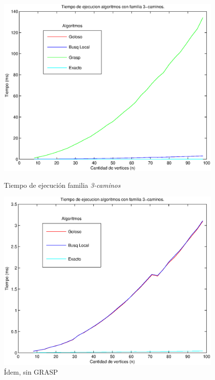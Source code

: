 \begin{figure}[H]
    \begin{minipage}{0.5\linewidth}
      \includegraphics[width=\linewidth]{graficos/todos_tiempo_3caminos.eps}
      \caption{Tiempo de ejecución familia \emph{3-caminos}}\label{fig:3caminos-all}
    \end{minipage}
    \hfill
    \begin{minipage}{0.5\linewidth}
      \includegraphics[width=\linewidth]{graficos/todos_tiempo_3caminos_sinG.eps}
      \caption{Ídem, sin GRASP}\label{fig:3caminos-sinG}
    \end{minipage}    
\end{figure}

